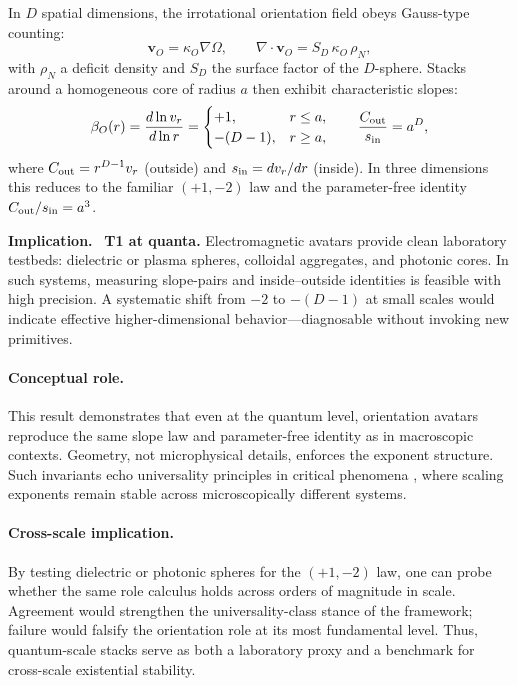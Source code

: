 \documentclass[12pt,a4paper,oneside]{scrreprt}
\newenvironment{implication}{\par\vspace{0.5em}\noindent\textbf{Implication.}\ }{\par\vspace{0.5em}}
\begin{document}
In $D$ spatial dimensions, the irrotational orientation field obeys Gauss-type counting:
\[
\mathbf v_O = \kappa_O \nabla \Omega,
\qquad
\nabla \!\cdot \mathbf v_O = S_D \, \kappa_O \, \rho_N,
\]
with $\rho_N$ a deficit density and $S_D$ the surface factor of the $D$-sphere. 
Stacks around a homogeneous core of radius $a$ then exhibit characteristic slopes:
\begin{equation}
\beta_O(r) = \frac{d \ln v_r}{d \ln r} =
\begin{cases}
+1, & r \le a, \\
-(D-1), & r \ge a,
\end{cases}
\qquad
\frac{C_{\rm out}}{s_{\rm in}} = a^D, 
\label{eq:quanta-T1D}
\end{equation}
where $C_{\rm out} = r^{D-1} v_r$ (outside) and $s_{\rm in} = dv_r/dr$ (inside). 
In three dimensions this reduces to the familiar $(+1,-2)$ law and the parameter-free identity $C_{\rm out}/s_{\rm in} = a^3$. 

\begin{implication}
\textbf{T1 at quanta.} 
Electromagnetic avatars provide clean laboratory testbeds: dielectric or plasma spheres, 
colloidal aggregates, and photonic cores. 
In such systems, measuring slope-pairs and inside–outside identities is feasible with 
high precision. 
A systematic shift from $-2$ to $-(D-1)$ at small scales would indicate effective higher-dimensional behavior—diagnosable without invoking new primitives.
\end{implication}

\paragraph{Conceptual role.} 
This result demonstrates that even at the quantum level, orientation avatars reproduce 
the same slope law and parameter-free identity as in macroscopic contexts. 
Geometry, not microphysical details, enforces the exponent structure. 
Such invariants echo universality principles in critical phenomena \citep{Wilson1971RG}, 
where scaling exponents remain stable across microscopically different systems. 

\paragraph{Cross-scale implication.} 
By testing dielectric or photonic spheres for the $(+1,-2)$ law, one can probe whether 
the same role calculus holds across orders of magnitude in scale. 
Agreement would strengthen the universality-class stance of the framework; 
failure would falsify the orientation role at its most fundamental level. 
Thus, quantum-scale stacks serve as both a laboratory proxy and a benchmark 
for cross-scale existential stability.
\end{document}
